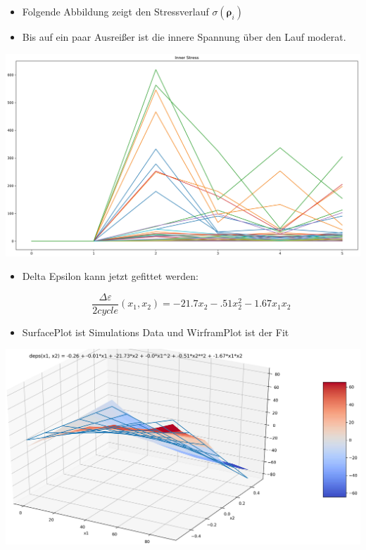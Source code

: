 \documentclass[10pt,a4paper]{article}
\begin{document}
\begin{itemize}
	\item Folgende Abbildung zeigt den Stressverlauf $\sigma(\bm{\rho}_i)$
	
	\item Bis auf ein paar Ausreißer ist die innere Spannung über den Lauf moderat.
\end{itemize}

\includegraphics[width=.95\textwidth]{pics/model_2/GeckoBotGaitStress.jpg}


\begin{itemize}
	\item Delta Epsilon kann jetzt gefittet werden:
	
	\begin{equation}
	\frac{\Delta \varepsilon}{2 cycle} (x_1, x_2) = -21.7 x_2 -.51 x_2^2 - 1.67x_1x_2
	\end{equation}
	
	\item SurfacePlot ist Simulations Data und WirframPlot ist der Fit
\end{itemize}

\includegraphics[width=.95\textwidth]{pics/model_2/Fit.jpg}
\end{document}
